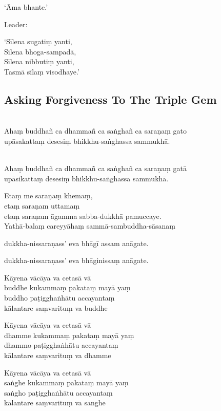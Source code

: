 ‘Āma bhante.’

\begin{instruction}
  Leader:
\end{instruction}

‘Sīlena sugatiṃ yanti,\\
Sīlena bhoga-sampadā,\\
Sīlena nibbutiṃ yanti,\\
Tasmā sīlaṃ visodhaye.’

\ifhandbookedition
\clearpage
\fi

\subsection{Asking Forgiveness To The Triple Gem}

\\\relax
Ahaṃ buddhañ ca dhammañ ca saṅghañ ca saraṇaṃ gato\\
upāsakattaṃ desesiṃ bhikkhu-saṅghassa sammukhā.

\\\relax
Ahaṃ buddhañ ca dhammañ ca saṅghañ ca saraṇaṃ gatā\\
upāsikattaṃ desesiṃ bhikkhu-saṅghassa sammukhā.

Etaṃ me saraṇaṃ khemaṃ,\\
etaṃ saraṇam uttamaṃ\\
etaṃ saraṇam āgamma sabba-dukkhā pamuccaye.\\
Yathā-balaṃ careyyāhaṃ sammā-sambuddha-sāsanaṃ

%
dukkha-nissaraṇass' eva bhāgī assam anāgate.

%
dukkha-nissaraṇass' eva bhāginissaṃ anāgate.

Kāyena vācāya va cetasā vā\\
buddhe kukammaṃ pakataṃ mayā yaṃ\\
buddho paṭigghaṅhātu accayantaṃ\\
kālantare saṃvarituṃ va buddhe

Kāyena vācāya va cetasā vā\\
dhamme kukammaṃ pakataṃ mayā yaṃ\\
dhammo paṭigghaṅhātu accayantaṃ\\
kālantare saṃvarituṃ va dhamme

Kāyena vācāya va cetasā vā\\
saṅghe kukammaṃ pakataṃ mayā yaṃ\\
saṅgho paṭigghaṅhātu accayantaṃ\\
kālantare saṃvarituṃ va sanghe

